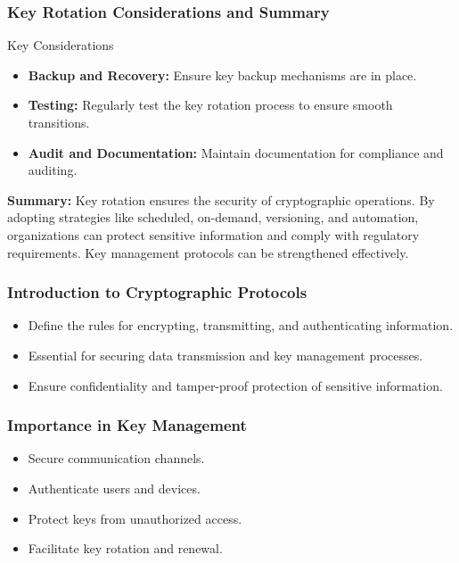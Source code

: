 \documentclass{beamer}
\begin{document}
\begin{frame}[fragile]
    \frametitle{Key Rotation Considerations and Summary}
    \begin{block}{Key Considerations}
        \begin{itemize}
            \item \textbf{Backup and Recovery:} Ensure key backup mechanisms are in place.
            \item \textbf{Testing:} Regularly test the key rotation process to ensure smooth transitions.
            \item \textbf{Audit and Documentation:} Maintain documentation for compliance and auditing.
        \end{itemize}
    \end{block}

    \textbf{Summary:}
    Key rotation ensures the security of cryptographic operations. By adopting strategies like scheduled, on-demand, versioning, and automation, organizations can protect sensitive information and comply with regulatory requirements. Key management protocols can be strengthened effectively.
\end{frame}

\begin{frame}[fragile]
    \frametitle{Introduction to Cryptographic Protocols}
    \begin{itemize}
        \item Define the rules for encrypting, transmitting, and authenticating information.
        \item Essential for securing data transmission and key management processes.
        \item Ensure confidentiality and tamper-proof protection of sensitive information.
    \end{itemize}
\end{frame}

\begin{frame}[fragile]
    \frametitle{Importance in Key Management}
    \begin{itemize}
        \item Secure communication channels.
        \item Authenticate users and devices.
        \item Protect keys from unauthorized access.
        \item Facilitate key rotation and renewal.
    \end{itemize}
\end{frame}
\end{document}
